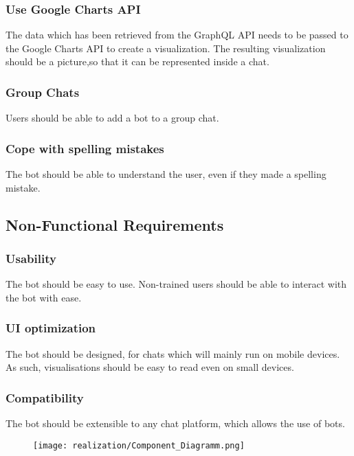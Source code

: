 \subsubsection{Use Google Charts API} The data which has been retrieved from the GraphQL API needs to be passed to the Google Charts API to create a visualization. The resulting visualization should be a picture,so that it can be represented inside a chat.

\subsubsection{Group Chats} Users should be able to add a bot to a group chat.

\subsubsection{Cope with spelling mistakes} The bot should be able to understand the user, even if they made a spelling mistake.

\subsection{Non-Functional Requirements}

\subsubsection{Usability} The bot should be easy to use. Non-trained users should be able to interact with the bot with ease.

\subsubsection{UI optimization} The bot should be designed, for chats which will mainly run on mobile devices. As such, visualisations should be easy to read even on small devices.

\subsubsection{Compatibility} The bot should be extensible to any chat platform, which allows the use of bots.

\begin{figure}[h]
    \centering
    \texttt{[image: realization/Component\_Diagramm.png]}
\end{figure}